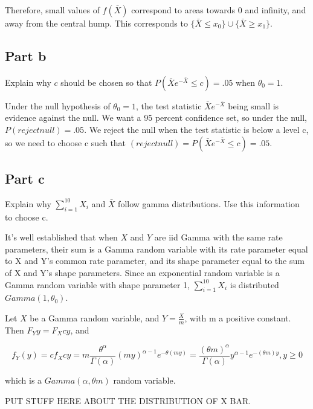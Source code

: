 \documentclass{article}
\begin{document}
Therefore, small values of $f(\bar{X})$ correspond to areas towards 0 and infinity, and away from the central hump. This corresponds to $\{\bar{X} \leq x_0\} \cup \{\bar{X} \geq x_1\}$.

\subsection*{Part b}

Explain why $c$ should be chosen so that $P(\bar{X} e^{-\bar{X}} \leq c) = .05$ when $\theta_0 = 1$.

Under the null hypothesis of $\theta_0 = 1$, the test statistic $\bar{X} e^{-\bar{X}}$ being small is evidence against the null. We want a 95 percent confidence set, so under the null, $P(reject null) = .05$. We reject the null when the test statistic is below a level c, so we need to choose c such that $(reject null) = P(\bar{X} e^{-\bar{X}} \leq c) = .05$.

\subsection*{Part c}

Explain why $\sum_{i=1}^{10} X_i$ and $\bar{X}$ follow gamma distributions. Use this information to choose c.

It's well established that when $X$ and $Y$ are iid Gamma with the same rate parameters, their sum is a Gamma random variable with its rate parameter equal to X and Y's common rate parameter, and its shape parameter equal to the sum of X and Y's shape parameters. Since an exponential random variable is a Gamma random variable with shape parameter 1, $\sum_{i=1}^{10} X_i$ is distributed $Gamma(1, \theta_0)$.

Let $X$ be a Gamma random variable, and $Y = \frac{X}{m}$, with m a positive constant. Then $F_Y{y} = F_X{cy}$, and

\[
f_Y(y) = cf_X{cy} = m\frac{\theta^\alpha}{\Gamma(\alpha)} (my)^{\alpha-1} e^{-\theta(my)}
= \frac{(\theta m)^\alpha}{\Gamma(\alpha)} y^{\alpha-1} e^{-(\theta m)y}, y \geq 0
\]

which is a $Gamma(\alpha, \theta m)$ random variable.

PUT STUFF HERE ABOUT THE DISTRIBUTION OF X BAR.
\end{document}
